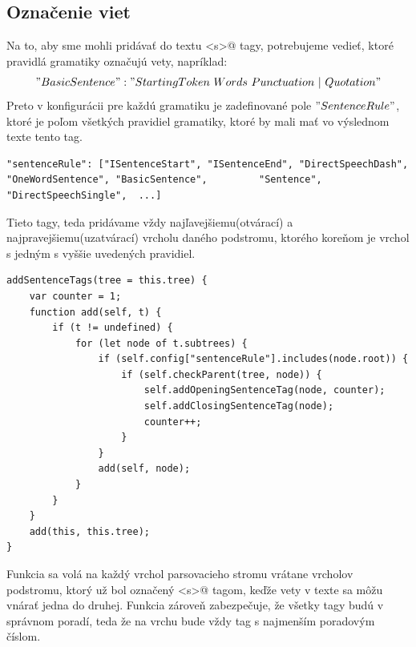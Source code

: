 \documentclass[12pt,a4paper]{report}
\theoremstyle{definition}
\theoremstyle{remark}
\begin{document}
\subsection{Označenie viet}
Na to, aby sme mohli pridávať do textu \verb@<s>@ tagy, potrebujeme vedieť, ktoré pravidlá gramatiky označujú vety, napríklad: $$"BasicSentence": "StartingToken\ Words\ Punctuation\ |\ Quotation"$$ Preto v konfigurácii pre každú gramatiku je zadefinované pole $"SentenceRule"$, ktoré je poľom všetkých pravidiel gramatiky, ktoré by mali mať vo výslednom texte tento tag.

\begin{lstlisting}[style=htmlcssjs]
"sentenceRule": ["ISentenceStart", "ISentenceEnd", "DirectSpeechDash", "OneWordSentence", "BasicSentence",         "Sentence", "DirectSpeechSingle",  ...]
\end{lstlisting}

Tieto tagy, teda pridávame vždy najľavejšiemu(otvárací) a najpravejšiemu(uzatvárací) vrcholu daného podstromu, ktorého koreňom je vrchol s jedným s vyššie uvedených pravidiel.
\begin{lstlisting}[style=htmlcssjs]
addSentenceTags(tree = this.tree) {
	var counter = 1;
	function add(self, t) {
		if (t != undefined) {
			for (let node of t.subtrees) {
				if (self.config["sentenceRule"].includes(node.root)) {
					if (self.checkParent(tree, node)) {
						self.addOpeningSentenceTag(node, counter);
						self.addClosingSentenceTag(node);
						counter++;
					}
				}
				add(self, node);
			}
		}
	}
	add(this, this.tree);
}
\end{lstlisting}

Funkcia sa volá na každý vrchol parsovacieho stromu vrátane vrcholov podstromu, ktorý už bol označený \verb@<s>@ tagom, keďže vety v texte sa môžu vnárať jedna do druhej. Funkcia zároveň zabezpečuje, že všetky tagy budú v správnom poradí, teda že na vrchu bude vždy tag s najmenším poradovým číslom.
\end{document}
